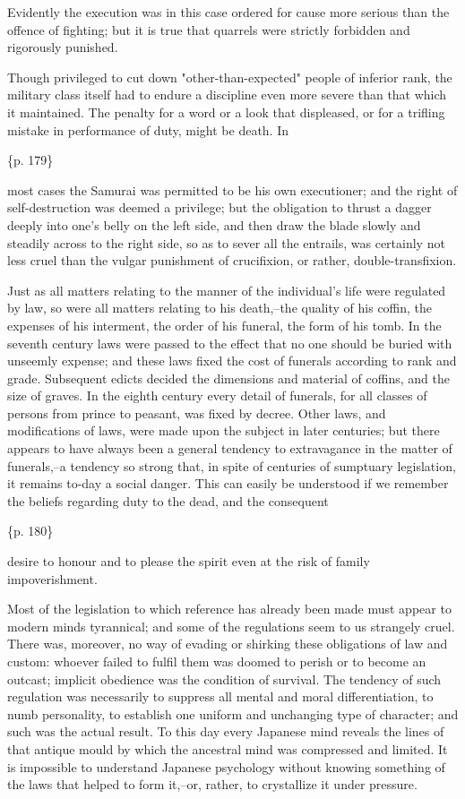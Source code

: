 Evidently the execution was in this case ordered for cause more serious than the offence of fighting; but it is true that quarrels were strictly forbidden and rigorously punished.

Though privileged to cut down "other-than-expected" people of inferior rank, the military class itself had to endure a discipline even more severe than that which it maintained. The penalty for a word or a look that displeased, or for a trifling mistake in performance of duty, might be death. In

\{p. 179\}

most cases the Samurai was permitted to be his own executioner; and the right of self-destruction was deemed a privilege; but the obligation to thrust a dagger deeply into one's belly on the left side, and then draw the blade slowly and steadily across to the right side, so as to sever all the entrails, was certainly not less cruel than the vulgar punishment of crucifixion, or rather, double-transfixion.



Just as all matters relating to the manner of the individual's life were regulated by law, so were all matters relating to his death,--the quality of his coffin, the expenses of his interment, the order of his funeral, the form of his tomb. In the seventh century laws were passed to the effect that no one should be buried with unseemly expense; and these laws fixed the cost of funerals according to rank and grade. Subsequent edicts decided the dimensions and material of coffins, and the size of graves. In the eighth century every detail of funerals, for all classes of persons from prince to peasant, was fixed by decree. Other laws, and modifications of laws, were made upon the subject in later centuries; but there appears to have always been a general tendency to extravagance in the matter of funerals,--a tendency so strong that, in spite of centuries of sumptuary legislation, it remains to-day a social danger. This can easily be understood if we remember the beliefs regarding duty to the dead, and the consequent

\{p. 180\}

desire to honour and to please the spirit even at the risk of family impoverishment.



Most of the legislation to which reference has already been made must appear to modern minds tyrannical; and some of the regulations seem to us strangely cruel. There was, moreover, no way of evading or shirking these obligations of law and custom: whoever failed to fulfil them was doomed to perish or to become an outcast; implicit obedience was the condition of survival. The tendency of such regulation was necessarily to suppress all mental and moral differentiation, to numb personality, to establish one uniform and unchanging type of character; and such was the actual result. To this day every Japanese mind reveals the lines of that antique mould by which the ancestral mind was compressed and limited. It is impossible to understand Japanese psychology without knowing something of the laws that helped to form it,--or, rather, to crystallize it under pressure.

